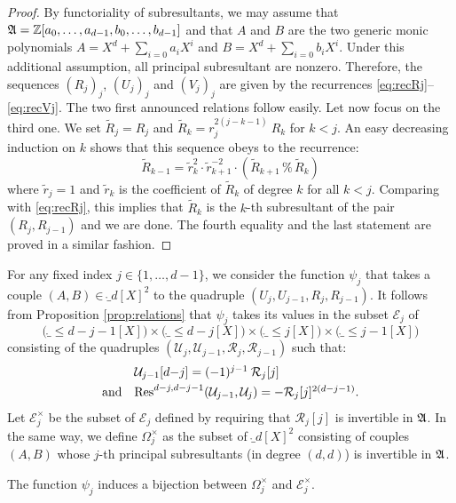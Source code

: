 \documentclass{article}
\begin{document}
\begin{proof}

By functoriality of subresultants, we may assume that $\mathfrak A = \mathbb Z[a_0, 
\ldots, a_{d-1}, b_0, \ldots, b_{d-1}]$ and that $A$ and $B$ are the two 
generic monic polynomials $A = X^d + \sum_{i=0} a_i X^i$ and $B = X^d + 
\sum_{i=0} b_i X^i$. Under this additional assumption, all principal
subresultant are nonzero. Therefore, the sequences $(R_j)_j$, $(U_j)_j$
and $(V_j)_j$ are given by the recurrences \eqref{eq:recRj}--\eqref{eq:recVj}.
The two first announced relations follow easily. Let now focus on the
third one. We set $\tilde R_j = R_j$ and $\tilde R_k = r_j^{2(j-k-1)} 
\: R_k$ for $k < j$. An easy decreasing induction on $k$ shows that this 
sequence obeys to the recurrence:
$$\tilde R_{k-1} = \tilde r_k^2 \cdot \tilde r_{k+1}^{-2} \cdot 
(\tilde R_{k+1} \,\%\, \tilde R_k)$$
where $\tilde r_j = 1$ and $\tilde r_k$ is the coefficient of $\tilde 
R_k$ of degree $k$ for all $k < j$. Comparing with \eqref{eq:recRj},
this implies that $\tilde R_k$ is the $k$-th subresultant of the pair 
$(R_j, R_{j-1})$ and we are done. The fourth equality and the last
statement are proved in a similar fashion.
\end{proof}

For any fixed index $j \in \{1, \ldots, d-1\}$, we consider the 
function $\psi_j$ that takes a couple $(A,B) \in \ring_d[X]^2$ to the
quadruple $(U_j, U_{j-1}, R_j, R_{j-1})$. It follows from Proposition
\ref{prop:relations} that $\psi_j$ takes its values in the subset 
$\mathcal E_j$ of
$$\big(\ring_{\leq d-j-1}[X]\big) \times \big(\ring_{\leq d-j}[X]\big) \times 
\big(\ring_{\leq j}[X]\big) \times \big(\ring_{\leq j-1}[X]\big)$$
consisting of the quadruples $(\mathcal U_j, \mathcal U_{j-1}, \mathcal
R_j, \mathcal R_{j-1})$ such that:
$$\begin{array}{ll}
&\mathcal U_{j-1}[d{-}j] = (-1)^{j-1} \: \mathcal R_j[j] \smallskip \\
\text{and} &
\Res^{d-j,d-j-1}(\mathcal U_{j-1}, \mathcal U_j) = -\mathcal R_j[j]^{2(d-j-1)}.
\end{array}$$
Let $\mathcal E_j^\times$ be the subset of $\mathcal E_j$ defined by 
requiring that $\mathcal R_j[j]$ is invertible in $\mathfrak A$. In the same 
way, we define $\Omega_j^\times$ as the subset of $\ring_d[X]^2$ 
consisting of couples $(A,B)$ whose $j$-th principal subresultants (in 
degree $(d,d)$) is invertible in $\mathfrak A$.

\begin{prop}
\label{prop:bijection}
The function $\psi_j$ induces a bijection between
$\Omega_j^\times$ and $\mathcal E_j^\times$.
\end{prop}
\end{document}
